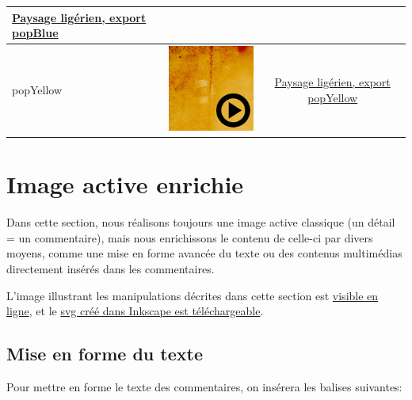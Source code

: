 \documentclass[a4paper,12pt]{report}
\begin{document}
\begin{center}
\begin{tabular}{|l|c|c|}
\href{http://geoffrey-gekiere.ac-versailles.fr/xia1/popBlue}{Paysage ligérien, export popBlue}\\
\hline
popYellow &  \includegraphics[scale=0.5]{./images/popYellow} & 
\href{http://geoffrey-gekiere.ac-versailles.fr/xia1/popYellow}{Paysage ligérien, export popYellow}\\
\hline
\end{tabular}
\end{center}

\section{Image active enrichie}

Dans cette section, nous réalisons toujours une image active classique (un détail = un commentaire),
mais nous enrichissons le contenu de celle-ci par divers moyens, comme une mise en forme avancée du texte ou des contenus 
multimédias directement insérés dans les commentaires.

L'image illustrant les manipulations décrites dans cette section est \href{http://geoffrey-gekiere.ac-versailles.fr/xia2/}
{visible en ligne}, et le \href{http://geoffrey-gekiere.ac-versailles.fr/xia2/svg/xia2.svg}{svg créé dans Inkscape est téléchargeable}.

\subsection{Mise en forme du texte}

Pour mettre en forme le texte des commentaires, on insérera les balises suivantes:
\end{document}
